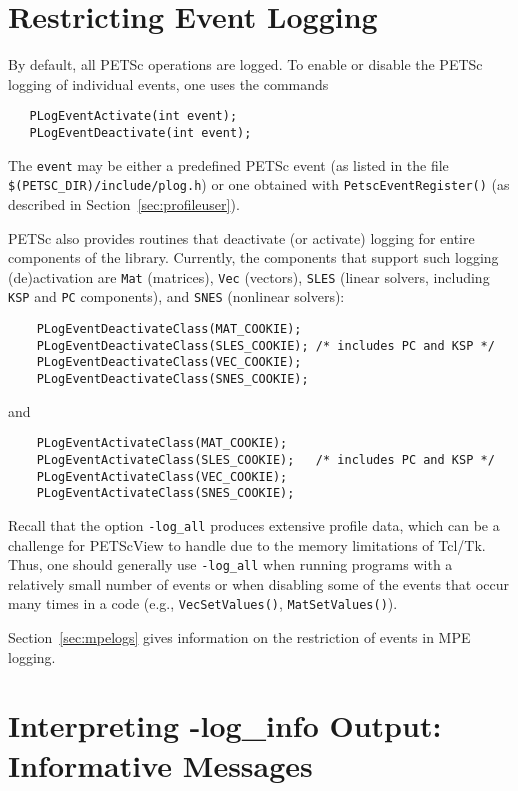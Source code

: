\section{Restricting Event Logging}
\label{sec:deactivate}

By default, all PETSc operations are logged.
To enable or disable the PETSc logging of individual events, one uses the commands
\begin{verbatim}
   PLogEventActivate(int event);
   PLogEventDeactivate(int event);
\end{verbatim}
The {\tt event} may be either a predefined PETSc event (as listed in
the file {\tt \$(PETSC\_DIR)/include/plog.h}) or one obtained with
{\tt PetscEventRegister()} (as described in Section~\ref{sec:profileuser}).

PETSc also provides routines that deactivate (or activate)
logging for entire components of the library. Currently, the 
components that support such logging (de)activation are {\tt Mat} (matrices),
{\tt Vec} (vectors), {\tt SLES} (linear solvers, including {\tt KSP} 
and {\tt PC} components), and {\tt SNES} (nonlinear solvers):
\begin{verbatim}
    PLogEventDeactivateClass(MAT_COOKIE);
    PLogEventDeactivateClass(SLES_COOKIE); /* includes PC and KSP */
    PLogEventDeactivateClass(VEC_COOKIE);
    PLogEventDeactivateClass(SNES_COOKIE);
\end{verbatim}
and 
\begin{verbatim}
    PLogEventActivateClass(MAT_COOKIE);
    PLogEventActivateClass(SLES_COOKIE);   /* includes PC and KSP */
    PLogEventActivateClass(VEC_COOKIE);
    PLogEventActivateClass(SNES_COOKIE);
\end{verbatim}

Recall that the option {\tt -log\_all} produces extensive profile
data, which can be a challenge for PETScView to handle due to
the memory limitations of Tcl/Tk.  Thus, one should generally use
{\tt -log\_all} when running programs with a relatively small
number of events or when disabling some of the events that occur many
times in a code (e.g., {\tt VecSetValues()}, {\tt MatSetValues()}).

Section~\ref{sec:mpelogs} gives information on the restriction of events
in MPE logging.


\section{Interpreting -log\_info Output: Informative Messages}
\label{sec:ploginfo}

